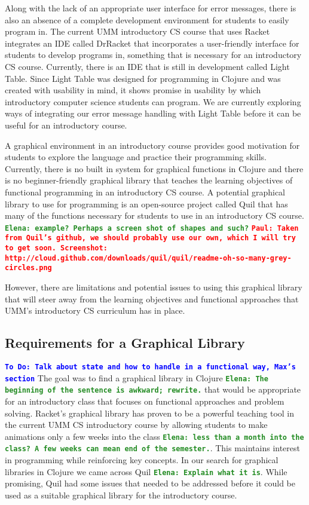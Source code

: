 \documentclass[12pt]{article}
\newcommand{\comment}[1]{{\bf \tt  {#1}}}
\newcommand{\emcomment}[1]{\textcolor{ForestGreen}{\comment{Elena: {#1}}}}
\newcommand{\todo}[1]{\textcolor{blue}{\comment{To Do: {#1}}}}
\newcommand{\pscomment}[1]{\textcolor{red}{\comment{Paul: {#1}}}}
\begin{document}
Along with the lack of an appropriate user interface for error messages, there is also an absence of a complete development environment for students to easily program in. The current UMM introductory CS course that uses Racket integrates an IDE called DrRacket that incorporates a user-friendly interface for students to develop programs in, something that is necessary for an introductory CS course.  Currently, there is an IDE that is still in development called Light Table.  Since Light Table was designed for programming in Clojure and was created with usability in mind, it shows promise in usability by which introductory computer science students can program. We are currently exploring ways of integrating our error message handling with Light Table before it can be useful for an introductory course. 

A graphical environment in an introductory course provides good motivation for students to explore the language and practice their programming skills. Currently, there is no built in system for graphical functions in Clojure and there is no beginner-friendly graphical library that teaches the learning objectives of functional programming in an introductory CS course. A potential graphical library to use for programming is an open-source project called Quil that has many of the functions necessary for students to use in an introductory CS course.
\emcomment{example? Perhaps a screen shot of shapes and such?}
\pscomment{Taken from Quil's github, we should probably use our own, which I will try to get soon.  Screenshot: http://cloud.github.com/downloads/quil/quil/readme-oh-so-many-grey-circles.png}

However, there are limitations and potential issues to using this graphical library that will steer away from the learning objectives and functional approaches that UMM’s introductory CS curriculum has in place.


\subsection{Requirements for a Graphical Library}\label{subsec:requirements}
\todo{Talk about state and how to handle in a functional way, Max's section}
The goal was to find a graphical library in Clojure \emcomment{The beginning of the sentence is awkward; rewrite.}  that would be appropriate for an introductory class that focuses on functional approaches and problem solving. Racket's graphical library has proven to be a powerful teaching tool in the current UMM CS introductory course by allowing students to make animations only a few weeks into the class \emcomment{less than a month into the class? A few weeks can mean end of the semester.}. This maintains interest in programming while reinforcing key concepts. In our search for graphical libraries in Clojure we came across Quil \emcomment{Explain what it is}. While promising, Quil had some issues that needed to be addressed before it could be used as a suitable graphical library for the introductory course.
\end{document}
